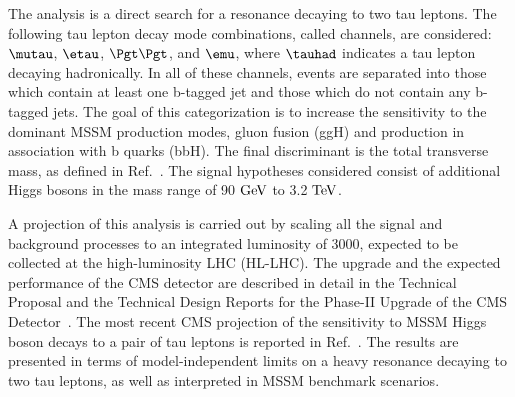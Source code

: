 The analysis is a direct search for a resonance decaying to two tau leptons.
The following tau lepton decay mode combinations, called channels, are considered: $\mutau$, $\etau$,
$\tautau$, and $\emu$, where $\tauhad$ indicates a tau lepton decaying hadronically. In
all of these channels, events are separated into those which contain
at least one b-tagged jet and those which do not contain any b-tagged jets. 
The goal of this categorization is to increase the sensitivity to the dominant MSSM production modes, 
gluon fusion (ggH) and production in association with b quarks (bbH). The final discriminant is the total 
transverse mass, as defined in Ref.~\cite{HIG-17-020}.
The signal hypotheses considered consist of additional Higgs
bosons in the mass range of 90$~\text{GeV}$ to 3.2$~\text{TeV}$.

A projection of this analysis is carried out by scaling all the signal
and background processes to an integrated luminosity of 3000\fbinv, expected to be collected at the high-luminosity LHC (HL-LHC). 
The upgrade and the expected performance of the CMS detector are described in detail
in the Technical Proposal and the Technical Design Reports for the Phase-II Upgrade of the CMS 
Detector~\cite{CMSPhase2TP,CMSPhase2TrackerTDR,CMSPhase2BarrelTDR,CMSPhase2MuonTDR,CMSPhase2EndcapTDR}. 
The most recent CMS projection of the sensitivity to MSSM Higgs boson decays to a pair of tau leptons is reported 
in Ref.~\cite{FTR-16-002}.
The results are presented in terms of model-independent limits on a heavy resonance 
decaying to two tau leptons, as well as interpreted in MSSM benchmark scenarios.
